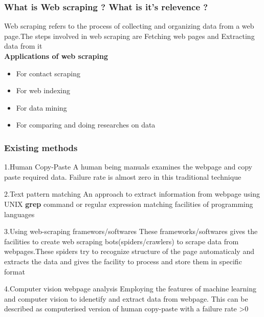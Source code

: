 \documentclass{beamer}
\begin{document}
\begin{frame}
\frametitle{What is Web scraping ? What is it's relevence ?}
Web scraping refers to the process of collecting and organizing data from a web page.The steps involved in web scraping are Fetching web pages and Extracting data from it\\
\vspace{4mm}
\textbf{Applications of web scraping}
\begin{itemize}
\item For contact scraping
\item For web indexing
\item For data mining
\item For comparing and doing researches on data
\end{itemize}
\end{frame}

\begin{frame}
\frametitle{Existing methods}
\begin{block}{1.Human Copy-Paste}
A human being manuals examines the webpage and copy paste required data. Failure rate is almost zero in this traditional technique
\end{block}
\begin{block}{2.Text pattern matching}
An approach to extract information from webpage using UNIX \textbf{grep} command or regular expression matching facilities of programming languages
\end{block}
\end{frame}

\begin{frame}
\begin{block}{3.Using web-scraping framewors/softwares}
These frameworks/softwares gives the facilities to create web scraping bots(spiders/crawlers) to scrape data from webpages.These spiders try to recognize structure of the page automaticaly and extracts the data and gives the facility to process and store them in specific format
\end{block}

\begin{block}{4.Computer vision webpage analysis}
Employing the features of machine learning and computer vision to idenetify and extract data from webpage. This can be described as computerised version of human copy-paste with a failure rate >0
\end{block}
\end{frame}
\end{document}
